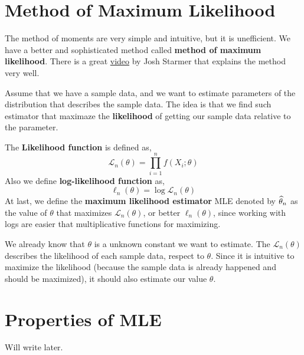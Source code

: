 \section{Method of Maximum Likelihood}
The method of moments are very simple and intuitive, but it is unefficient. We have a better and sophisticated method called 
\textbf{method of maximum likelihood}. There is a great \href{https://www.youtube.com/watch?v=XepXtl9YKwc}{video}  by Josh Starmer that explains the method very well.

Assume that we have a sample data, and we want to estimate parameters of the distribution that describes the sample data. The idea is that we find such estimator that maximaze the \textbf{likelihood} of getting our sample data relative to the parameter.
\begin{definition}
    The \textbf{Likelihood function} is defined as,
    \[ \mathcal{L}_n(\theta) = \prod_{i=1}^n f(X_i; \theta) \]
    Also we define \textbf{log-likelihood function} as,
    \[\ell_n( \theta) = \log \mathcal{L}_n(\theta) \]
    At last, we define the \textbf{maximum likelihood estimator} MLE denoted by ${\widehat{\theta}}_n$ as the value of $\theta$ that maximizes $\mathcal{L}_n(\theta)$, or better $\ell_n( \theta)$, since working with logs are easier that multiplicative functions for maximizing.
\end{definition}
We already know that $\theta$ is a unknown constant we want to estimate. The $\mathcal{L}_n(\theta)$ describes the likelihood of each sample data, respect to $\theta$. Since it is intuitive to maximize the likelihood (because the sample data is already happened and should be maximized), it should also estimate our value $\theta$.
\section{Properties of MLE}
Will write later.
